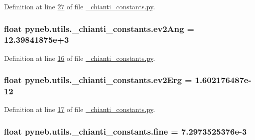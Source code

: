 Definition at line \hyperlink{__chianti__constants_8py_source_l00027}{27} of file \hyperlink{__chianti__constants_8py_source}{\-\_\-chianti\-\_\-constants.\-py}.

\hypertarget{namespacepyneb_1_1utils_1_1__chianti__constants_a847490e29d2f997f05813f55958d4edb}{
\subsubsection[{ev2\-Ang}]{\setlength{\rightskip}{0pt plus 5cm}float pyneb.\-utils.\-\_\-chianti\-\_\-constants.\-ev2\-Ang = 12.\-39841875e+3}}\label{namespacepyneb_1_1utils_1_1__chianti__constants_a847490e29d2f997f05813f55958d4edb}


Definition at line \hyperlink{__chianti__constants_8py_source_l00016}{16} of file \hyperlink{__chianti__constants_8py_source}{\-\_\-chianti\-\_\-constants.\-py}.

\hypertarget{namespacepyneb_1_1utils_1_1__chianti__constants_a0c7ba0e50d6114898e5ede4ee5e6ffa9}{
\subsubsection[{ev2\-Erg}]{\setlength{\rightskip}{0pt plus 5cm}float pyneb.\-utils.\-\_\-chianti\-\_\-constants.\-ev2\-Erg = 1.\-602176487e-\/12}}\label{namespacepyneb_1_1utils_1_1__chianti__constants_a0c7ba0e50d6114898e5ede4ee5e6ffa9}


Definition at line \hyperlink{__chianti__constants_8py_source_l00017}{17} of file \hyperlink{__chianti__constants_8py_source}{\-\_\-chianti\-\_\-constants.\-py}.

\hypertarget{namespacepyneb_1_1utils_1_1__chianti__constants_a4e322555208449fea631150c720abb5a}{
\subsubsection[{fine}]{\setlength{\rightskip}{0pt plus 5cm}float pyneb.\-utils.\-\_\-chianti\-\_\-constants.\-fine = 7.\-2973525376e-\/3}}\label{namespacepyneb_1_1utils_1_1__chianti__constants_a4e322555208449fea631150c720abb5a}


